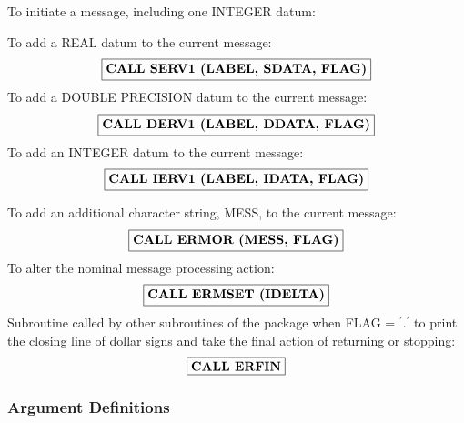 \documentclass[twoside]{MATH77}
\begin{document}
\begin{center}
\end{center}

To initiate a message, including one INTEGER datum:

\begin{center}
\end{center}

To add a REAL datum to the current message:
$$
\fbox{\bf CALL SERV1 (LABEL, SDATA, FLAG)}
$$
To add a DOUBLE PRECISION datum to the current message:
$$
\fbox{\bf CALL DERV1 (LABEL, DDATA, FLAG)}
$$
To add an INTEGER datum to the current message:
$$
\fbox{\bf CALL IERV1 (LABEL, IDATA, FLAG)}
$$
\pagebreak

To add an additional character string, MESS, to the current message:
$$
\fbox{\bf CALL ERMOR (MESS, FLAG)}
$$
To alter the nominal message processing action:
$$
\fbox{\bf CALL ERMSET (IDELTA)}
$$
Subroutine called by other subroutines of the package when
FLAG = $^{\prime}.^{\prime}$ to print the closing line of dollar signs
and take the final action of returning or stopping:
$$
\fbox{\bf CALL ERFIN}
$$
\subsubsection{Argument Definitions}
\end{document}
